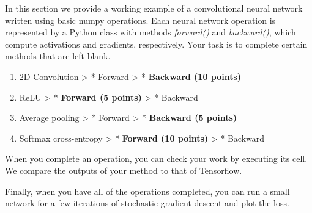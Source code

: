 \documentclass[11pt]{article}
\providecommand{\tightlist}{%
      \setlength{\itemsep}{0pt}\setlength{\parskip}{0pt}}
\begin{document}
    In this section we provide a working example of a convolutional neural
network written using basic numpy operations. Each neural network
operation is represented by a Python class with methods \emph{forward()}
and \emph{backward()}, which compute activations and gradients,
respectively. Your task is to complete certain methods that are left
blank.

\begin{enumerate}
\def\labelenumi{\arabic{enumi}.}
\tightlist
\item
  2D Convolution \textgreater{} * Forward \textgreater{} *
  \textbf{Backward (10 points)}
\item
  ReLU \textgreater{} * \textbf{Forward (5 points)} \textgreater{} *
  Backward
\item
  Average pooling \textgreater{} * Forward \textgreater{} *
  \textbf{Backward (5 points)}
\item
  Softmax cross-entropy \textgreater{} * \textbf{Forward (10 points)}
  \textgreater{} * Backward
\end{enumerate}

When you complete an operation, you can check your work by executing its
cell. We compare the outputs of your method to that of Tensorflow.

Finally, when you have all of the operations completed, you can run a
small network for a few iterations of stochastic gradient descent and
plot the loss.
\end{document}
